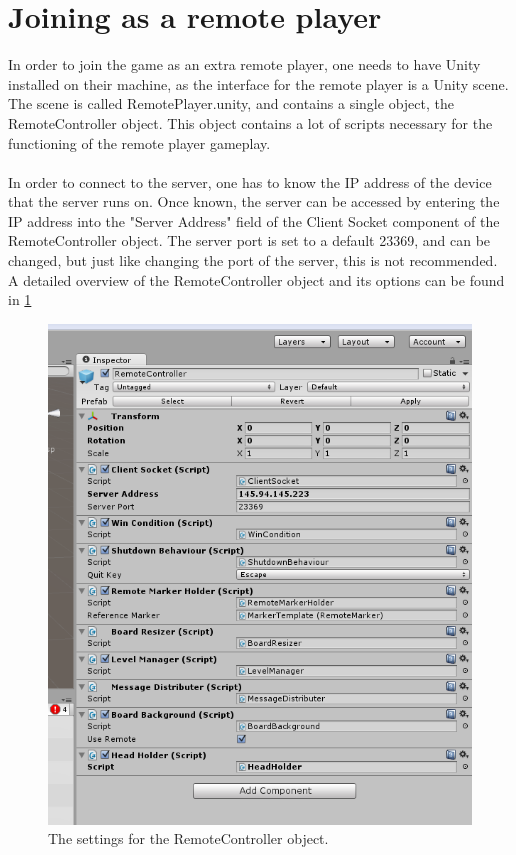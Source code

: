 \documentclass[]{report}
\begin{document}
\section*{Joining as a remote player}
In order to join the game as an extra remote player, one needs to have Unity
installed on their machine, as the interface for the remote player is a Unity
scene. The scene is called RemotePlayer.unity, and contains a single object,
the RemoteController object. This object contains a lot of scripts necessary
for the functioning of the remote player gameplay.\\
\\
In order to connect to the server, one has to know the IP address of the
device that the server runs on. Once known, the server can be accessed by
entering the IP address into the "Server Address" field of the Client Socket
component of the RemoteController object. The server port is set to a default
23369, and can be changed, but just like changing the port of the server,
this is not recommended. A detailed overview of the RemoteController object
and its options can be found in \ref{fig:remotecontroller}
\begin{figure}[!ht]
	\centering
	\includegraphics[scale = 0.6]{RemoteController}
	\caption{The settings for the RemoteController object.}
	\label{fig:remotecontroller}
\end{figure}
\end{document}
